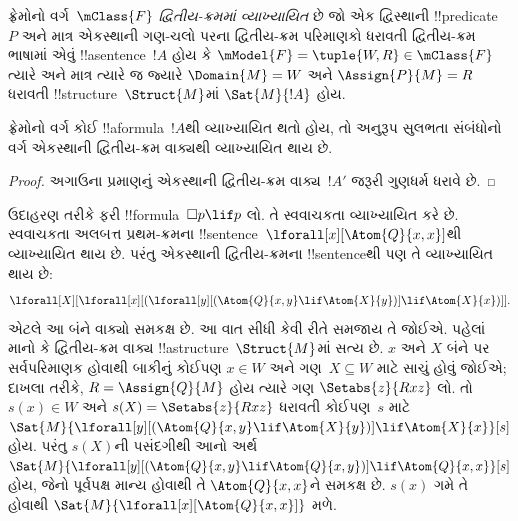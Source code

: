 \documentclass[../../../include/open-logic-section]{subfiles}
\begin{document}
\begin{defn}
  ફ્રેમોનો વર્ગ~$\mClass{F}$ \emph{દ્વિતીય-ક્રમમાં
  વ્યાખ્યાયિત} છે જો એક દ્વિસ્થાની !!{predicate}~$P$
  અને માત્ર એકસ્થાની ગણ-ચલો પરના દ્વિતીય-ક્રમ પરિમાણકો
  ધરાવતી દ્વિતીય-ક્રમ ભાષામાં એવું !!a{sentence}~$!A$
  હોય કે $\mModel{F} = \tuple{W, R} \in \mClass{F}$
  ત્યારે અને માત્ર ત્યારે જ જ્યારે $\Domain{M} = W$
  અને $\Assign{P}{M} = R$ ધરાવતી
  !!{structure}~$\Struct{M}$માં $\Sat{M}{!A}$ હોય.
\end{defn}

\begin{cor}
  ફ્રેમોનો વર્ગ કોઈ !!a{formula}~$!A$થી
  વ્યાખ્યાયિત થતો હોય, તો અનુરૂપ સુલભતા
  સંબંધોનો વર્ગ એકસ્થાની દ્વિતીય-ક્રમ વાક્યથી
  વ્યાખ્યાયિત થાય છે.
\end{cor}

\begin{proof}
  અગાઉના પ્રમાણનું એકસ્થાની દ્વિતીય-ક્રમ
  વાક્ય~$!A'$ જરૂરી ગુણધર્મ ધરાવે છે.
\end{proof}

ઉદાહરણ તરીકે ફરી !!{formula}~$\Box p \lif p$ લો.
તે સ્વવાચકતા વ્યાખ્યાયિત કરે છે. સ્વવાચકતા
અલબત્ત પ્રથમ-ક્રમના !!{sentence}~$\lforall[x][\Atom{Q}{x,x}]$થી
વ્યાખ્યાયિત થાય છે. પરંતુ એકસ્થાની દ્વિતીય-ક્રમના
!!{sentence}થી પણ તે વ્યાખ્યાયિત થાય છે:
\[
\lforall[X][\lforall[x][(\lforall[y][(\Atom{Q}{x,y} \lif \Atom{X}{y})]
    \lif \Atom{X}{x})]].
\]
એટલે આ બંને વાક્યો સમકક્ષ છે. આ વાત સીધી
કેવી રીતે સમજાય તે જોઈએ. પહેલાં માનો કે
દ્વિતીય-ક્રમ વાક્ય !!a{structure}~$\Struct{M}$માં
સત્ય છે. $x$ અને $X$ બંને પર સર્વપરિમાણક
હોવાથી બાકીનું કોઈપણ $x \in W$ અને
ગણ~$X \subseteq W$ માટે સાચું હોવું જોઈએ;
દાખલા તરીકે, $R =
\Assign{Q}{M}$ હોય ત્યારે ગણ
$\Setabs{z}{Rxz}$ લો. તો $s(x) \in W$ અને
$s(X) =
\Setabs{z}{Rxz}$ ધરાવતી કોઈપણ~$s$ માટે
$\Sat{M}{\lforall[y][(\Atom{Q}{x,y} \lif
    \Atom{X}{y})] \lif \Atom{X}{x}}[s]$ હોય.
પરંતુ $s(X)$ની પસંદગીથી આનો અર્થ
$\Sat{M}{\lforall[y][(\Atom{Q}{x,y} \lif
    \Atom{Q}{x,y})] \lif \Atom{Q}{x,x}}[s]$ હોય,
જેનો પૂર્વપક્ષ માન્ય હોવાથી તે
$\Atom{Q}{x,x}$ને સમકક્ષ છે. $s(x)$ ગમે તે
હોવાથી $\Sat{M}{\lforall[x][\Atom{Q}{x,x}]}$ મળે.
\end{document}
